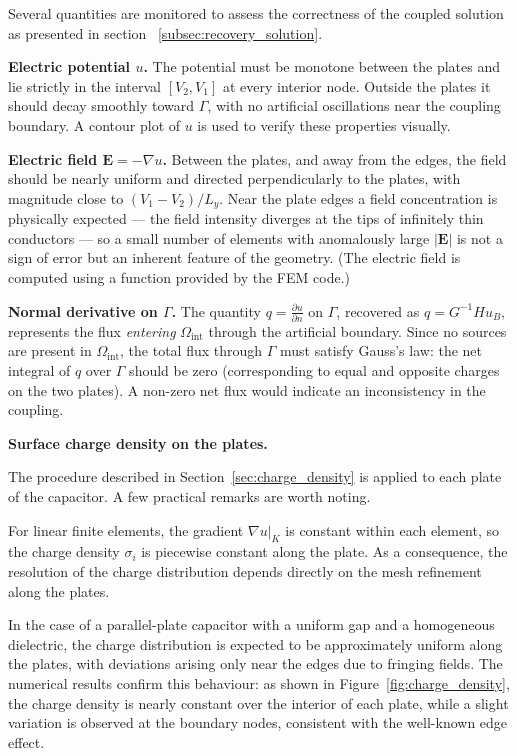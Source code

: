 \documentclass[11pt,onecolumn]{article}
\begin{document}
Several quantities are monitored to assess the correctness of the coupled solution as presented in section ~\ref{subsec:recovery_solution}.

\textbf{Electric potential $u$.} 
The potential must be monotone between the plates and lie strictly in the interval $[V_2, V_1]$ 
at every interior node. Outside the plates it should decay smoothly toward $\Gamma$, with no 
artificial oscillations near the coupling boundary. A contour plot of $u$ is used to verify 
these properties visually.

\textbf{Electric field $\mathbf{E} = -\nabla u$.}
Between the plates, and away from the edges, the field should be nearly uniform and directed 
perpendicularly to the plates, with magnitude close to $(V_1 - V_2)/L_y$. Near the plate edges 
a field concentration is physically expected — the field intensity diverges at the tips of 
infinitely thin conductors — so a small number of elements with anomalously large $|\mathbf{E}|$ 
is not a sign of error but an inherent feature of the geometry. (The electric field is computed using a function provided by the FEM code.)

\textbf{Normal derivative on $\Gamma$.}
The quantity $q = \frac{\partial u}{\partial n}$ on $\Gamma$, recovered as $q = G^{-1} H u_B$, represents the flux \textit{entering} $\Omega_{\mathrm{int}}$ through the artificial boundary. 
Since no sources are present in $\Omega_{\mathrm{int}}$, the total flux through 
$\Gamma$ must satisfy Gauss's law: the net integral of $q$ over $\Gamma$ should be zero 
(corresponding to equal and opposite charges on the two plates). 
A non-zero net flux would indicate an inconsistency in the coupling.

\textbf{Surface charge density on the plates.}
\label{sec:charge_density_results}

The procedure described in Section~\ref{sec:charge_density} is applied to 
each plate of the capacitor. A few practical remarks are worth noting.

For linear finite elements, the gradient $\nabla u|_K$ is constant within 
each element, so the charge density $\sigma_i$ is piecewise constant along 
the plate. As a consequence, the resolution of the charge distribution depends 
directly on the mesh refinement along the plates.

In the case of a parallel-plate capacitor with a uniform gap and a homogeneous 
dielectric, the charge distribution is expected to be approximately uniform 
along the plates, with deviations arising only near the edges due to fringing 
fields. The numerical results confirm this behaviour: as shown in 
Figure~\ref{fig:charge_density}, the charge density is nearly constant over 
the interior of each plate, while a slight variation is observed at the 
boundary nodes, consistent with the well-known edge effect.
\end{document}
